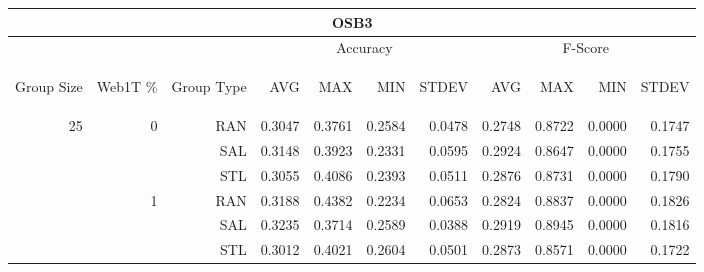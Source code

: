 \begin{center}
\begin{table}[htbp] 
 \begin{center}
\begin{tabular}{ | r | r | r | r | r | r | r | r | r | r | r |}
\hline
\multicolumn{11}{|c|}{OSB3}\\
\hline
 & & & \multicolumn{4}{|c|}{Accuracy} & \multicolumn{4}{|c|}{F-Score}\\ \cline{4-11}
\begin{sideways}Group Size\end{sideways} & \begin{sideways}Web1T \%\end{sideways} & \begin{sideways}Group Type\end{sideways} & \begin{sideways}AVG\end{sideways} & \begin{sideways}MAX\end{sideways} & \begin{sideways}MIN\end{sideways} & \begin{sideways}STDEV\end{sideways} & \begin{sideways}AVG\end{sideways} & \begin{sideways}MAX\end{sideways} & \begin{sideways}MIN\end{sideways} & \begin{sideways}STDEV\end{sideways}\\
\hline
\multirow{9}{*}{25}
 & \multirow{3}{*}{0} & RAN & 0.3047 & 0.3761 & 0.2584 & 0.0478 & 0.2748 & 0.8722 & 0.0000 & 0.1747\\ \cline{3-11}
 &   & SAL & 0.3148 & 0.3923 & 0.2331 & 0.0595 & 0.2924 & 0.8647 & 0.0000 & 0.1755\\ \cline{3-11}
 &   & STL & 0.3055 & 0.4086 & 0.2393 & 0.0511 & 0.2876 & 0.8731 & 0.0000 & 0.1790\\ \cline{2-11}
 & \multirow{3}{*}{1} & RAN & 0.3188 & 0.4382 & 0.2234 & 0.0653 & 0.2824 & 0.8837 & 0.0000 & 0.1826\\ \cline{3-11}
 &   & SAL & 0.3235 & 0.3714 & 0.2589 & 0.0388 & 0.2919 & 0.8945 & 0.0000 & 0.1816\\ \cline{3-11}
 &   & STL & 0.3012 & 0.4021 & 0.2604 & 0.0501 & 0.2873 & 0.8571 & 0.0000 & 0.1722\\ \cline{2-11}

\end{tabular}
\end{center}
\end{table}
\end{center}
